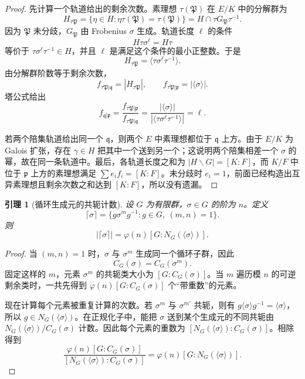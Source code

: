 \documentclass[11pt,a4paper,openany]{ctexbook}
\numberwithin{equation}{chapter}
\theoremstyle{plain}
\newtheorem{lemma}[theorem]{引理}
\theoremstyle{definition}
\theoremstyle{remark}
\begin{document}
\begin{proof}
先计算一个轨道给出的剩余次数。素理想 $\tau(\mathfrak P)$ 在 $E/K$ 中的分解群为
\[
H_{\tau\mathfrak P}
=\{\eta\in H:\eta\tau(\mathfrak P)=\tau(\mathfrak P)\}
=H\cap \tau G_{\mathfrak P}\tau^{-1}.
\]
因为 $\mathfrak P$ 未分歧，$G_{\mathfrak P}$ 由 Frobenius $\sigma$ 生成。轨道长度
$\ell$ 的条件
\[
H\tau\sigma^\ell=H\tau
\]
等价于 $\tau\sigma^\ell\tau^{-1}\in H$，并且 $\ell$ 是满足这个条件的最小正整数。于是
\[
H_{\tau\mathfrak P}=\langle\tau\sigma^\ell\tau^{-1}\rangle.
\]
由分解群阶数等于剩余次数，
\[
f_{\tau\mathfrak P|\mathfrak q}=|H_{\tau\mathfrak P}|,
\qquad
f_{\tau\mathfrak P|\mathfrak p}=|\langle\sigma\rangle|.
\]
塔公式给出
\[
f_{\mathfrak q|\mathfrak p}
=\frac{f_{\tau\mathfrak P|\mathfrak p}}
{f_{\tau\mathfrak P|\mathfrak q}}
=\frac{|\langle\sigma\rangle|}
{|\langle\tau\sigma^\ell\tau^{-1}\rangle|}
=\ell.
\]

若两个陪集轨道给出同一个 $\mathfrak q$，则两个 $E$ 中素理想都位于 $\mathfrak q$ 上方。由于 $E/K$ 为 Galois 扩张，存在 $\gamma\in H$ 把其中一个送到另一个；这说明两个陪集相差一个 $\sigma$ 的幂，故在同一条轨道中。最后，各轨道长度之和为
 $|H\backslash G|=[K:F]$，而 $K/F$ 中位于 $\mathfrak p$ 上方的素理想满足
\(\sum e_if_i=[K:F]\)。未分歧时 $e_i=1$，前面已经构造出互异素理想且剩余次数之和达到
$[K:F]$，所以没有遗漏。
\end{proof}

\begin{lemma}[循环生成元的共轭计数]
设 $G$ 为有限群，$\sigma\in G$ 的阶为 $n$。定义
\[
\lceil\sigma\rceil
=\{g\sigma^mg^{-1}:g\in G,\ (m,n)=1\}.
\]
则
\[
|\lceil\sigma\rceil|
=\varphi(n)[G:N_G(\langle\sigma\rangle)].
\]
\end{lemma}

\begin{proof}
当 $(m,n)=1$ 时，$\sigma$ 与 $\sigma^m$ 生成同一个循环子群，因此
\[
C_G(\sigma)=C_G(\sigma^m).
\]
固定这样的 $m$，元素 $\sigma^m$ 的共轭类大小为
$[G:C_G(\sigma)]$。当 $m$ 遍历模 $n$ 的可逆剩余类时，一共先得到
\(\varphi(n)[G:C_G(\sigma)]\) 个“带重数”的元素。

现在计算每个元素被重复计算的次数。若 $\sigma^m$ 与 $\sigma^{m'}$ 共轭，则有
$g\langle\sigma\rangle g^{-1}=\langle\sigma\rangle$，所以 $g\in N_G(\langle\sigma\rangle)$。在正规化子中，能把 $\sigma$ 送到某个生成元的不同共轭由
$N_G(\langle\sigma\rangle)/C_G(\sigma)$ 计数。因此每个元素的重数为
\([N_G(\langle\sigma\rangle):C_G(\sigma)]\)。相除得到
\[
\frac{\varphi(n)[G:C_G(\sigma)]}
{[N_G(\langle\sigma\rangle):C_G(\sigma)]}
=\varphi(n)[G:N_G(\langle\sigma\rangle)].
\]
\end{proof}
\end{document}
